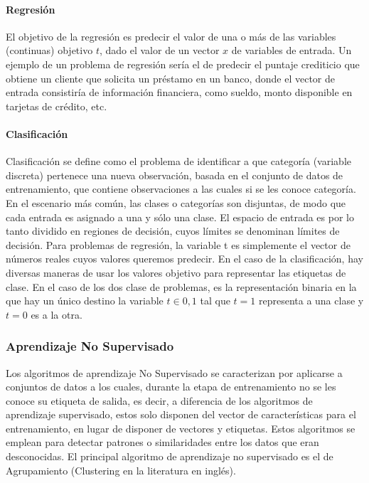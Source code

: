 \documentclass[a4paper,11pt,spanish]{book}
\begin{document}
	\paragraph {Regresión}
	  El objetivo de la regresión es predecir el valor de una o más de las variables (continuas) objetivo $t$, dado el valor de un vector $x$ de variables de entrada.
	  Un ejemplo de un problema de regresión sería el de predecir el puntaje crediticio que obtiene un cliente que solicita un préstamo en un banco, donde el vector de entrada
	  consistiría de información financiera, como sueldo, monto disponible en tarjetas de crédito, etc.

	\paragraph {Clasificación}
	  Clasificación se define como el problema de identificar a que categoría (variable discreta) pertenece una nueva observación, basada en el conjunto de datos de entrenamiento,
	  que contiene observaciones a las cuales  si se les conoce categoría. En el escenario más común, las clases o categorías son disjuntas,
	  de modo que cada entrada es asignado a una y sólo una clase. El espacio de entrada es por lo tanto dividido en regiones de decisión, cuyos límites se denominan límites de decisión.
	  Para problemas de regresión, la variable t es simplemente el vector de números reales cuyos valores queremos predecir. En el caso de la clasificación,
	  hay diversas maneras de usar los valores objetivo para representar las etiquetas de clase. En el caso de los dos clase de problemas, es la representación binaria
	  en la que hay un único destino la variable $t \in {0, 1}$ tal que $t = 1$ representa a una clase y $t = 0$ es a la otra.

      \subsubsection{Aprendizaje No Supervisado}
	  Los algoritmos de aprendizaje No Supervisado se caracterizan por aplicarse a conjuntos de datos a los cuales, durante la etapa de entrenamiento no se les conoce su etiqueta
	  de salida, es decir, a diferencia de los algoritmos de aprendizaje supervisado, estos solo disponen del vector de características para el entrenamiento, en lugar de disponer
	  de vectores y etiquetas. Estos algoritmos se emplean para detectar patrones o similaridades entre los datos que eran desconocidas.
	  El principal algoritmo de aprendizaje no supervisado es el de Agrupamiento (Clustering en la literatura en inglés).
\end{document}
